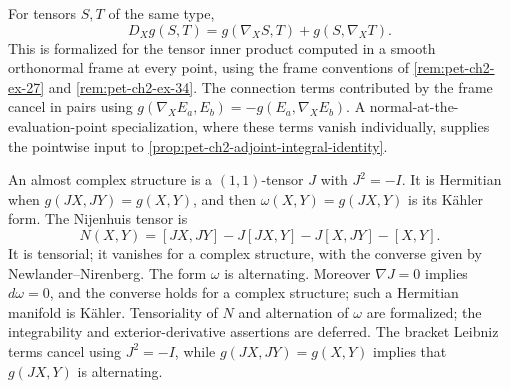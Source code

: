 \begin{remark}
  \label{rem:pet-ch2-ex-32}
  \leanok
  For tensors $S,T$ of the same type,
  \[
    D_Xg(S,T)=g(\nabla_XS,T)+g(S,\nabla_XT).
  \]
  This is formalized for the tensor inner product computed in a smooth
  orthonormal frame at every point, using the frame conventions of
  \cref{rem:pet-ch2-ex-27} and \cref{rem:pet-ch2-ex-34}.
  \sketch
  The connection terms contributed by the
  frame cancel in pairs using
  $g(\nabla_XE_a,E_b)=-g(E_a,\nabla_XE_b)$. A normal-at-the-evaluation-point
  specialization, where these terms vanish individually, supplies the
  pointwise input to
  \cref{prop:pet-ch2-adjoint-integral-identity}.
\end{remark}

\begin{remark}
  \label{rem:pet-ch2-ex-33}
  \leanok
  An almost complex structure is a $(1,1)$-tensor
  $J$ with $J^2=-I$. It is Hermitian when
  $g(JX,JY)=g(X,Y)$, and then
  $\omega(X,Y)=g(JX,Y)$ is its K\"ahler form. The Nijenhuis tensor is
  \[
    N(X,Y)=[JX,JY]-J[JX,Y]-J[X,JY]-[X,Y].
  \]
  It is tensorial; it vanishes for a complex structure, with the converse
  given by Newlander--Nirenberg. The form $\omega$ is alternating. Moreover
  $\nabla J=0$ implies $d\omega=0$, and the converse holds for a complex
  structure; such a Hermitian manifold is K\"ahler.
  Tensoriality of $N$ and alternation of $\omega$ are formalized; the
  integrability and exterior-derivative assertions are deferred.
  \sketch
  The bracket Leibniz terms cancel using $J^2=-I$, while
  $g(JX,JY)=g(X,Y)$ implies that $g(JX,Y)$ is alternating.
\end{remark}

